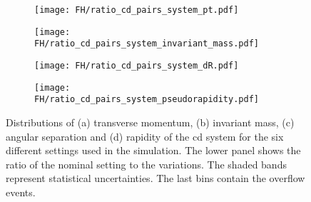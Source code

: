 \begin{figure}[H]
    \centering
    \begin{subfigure}{0.49\textwidth}
        \centering
        \texttt{[image: FH/ratio\_cd\_pairs\_system\_pt.pdf]}
        \caption{}
        \label{app:subfig:pt(cd)_FH}
    \end{subfigure}
    \begin{subfigure}{0.49\textwidth}
        \centering
        \texttt{[image: FH/ratio\_cd\_pairs\_system\_invariant\_mass.pdf]}
        \caption{}
        \label{app:subfig:m(cd)_FH}
    \end{subfigure}

    \vspace{0.2cm}
    
    \begin{subfigure}{0.49\textwidth}
        \centering
        \texttt{[image: FH/ratio\_cd\_pairs\_system\_dR.pdf]}
        \caption{}
        \label{app:subfig:dR(cd)_FH}
    \end{subfigure}
    \begin{subfigure}{0.49\textwidth}
        \centering
        \texttt{[image: FH/ratio\_cd\_pairs\_system\_pseudorapidity.pdf]}
        \caption{}
        \label{app:subfig:y(cd)_FH}
    \end{subfigure}
    \caption{Distributions of (a) transverse momentum, (b) invariant mass,  (c) angular separation and (d) rapidity of the cd system for the six different settings used in the simulation. The lower panel shows the ratio of the nominal setting to the variations. The shaded bands represent statistical uncertainties. The last bins contain the overflow events.}
    \label{app:fig:cd_FH}
\end{figure}




